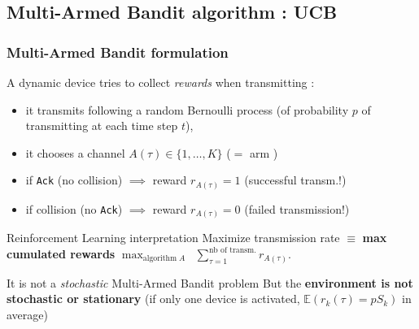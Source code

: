 \subsection{Multi-Armed Bandit algorithm : UCB}

\subsubsection{Multi-Armed Bandit formulation}

\begin{frameO}

    A dynamic device tries to collect \emph{rewards} when transmitting :

    \begin{itemize}
        \item
            it transmits following a random Bernoulli process \newline
            (of probability \(p\) of transmitting at each time step \(t\)),
        \item
            it chooses a channel \(A(\tau) \in \{1,\dots,K\}\)
            \hfill{} ($=$ arm \slotmachine)
        \item
            if \texttt{Ack} (no collision) \hspace*{2pt} \(\implies\) reward
            \(r_{A(\tau)} = 1\) \hfill{} (successful transm.!)
        \item
            if collision (no \texttt{Ack}) \hspace*{2pt} \(\implies\) reward
            \(r_{A(\tau)} = 0\) \hfill{} (failed transmission!)
    \end{itemize}

    \pause

    \begin{colorblock}{Reinforcement Learning interpretation}
        Maximize transmission rate \(\equiv\) \textbf{max cumulated rewards}
        \(\max_{\text{algorithm}\;A} \;\; \sum_{\tau=1}^{\text{nb of transm.}} r_{A(\tau)}.\)
    \end{colorblock}

    \begin{lightblock}{It is not a \emph{stochastic} Multi-Armed Bandit problem}
        But the \textbf{environment is not stochastic or stationary}\newline
        (if only one device is activated, \(\mathbb{E}(r_k(\tau) = p S_k)\) in average)
    \end{lightblock}

\end{frameO}

